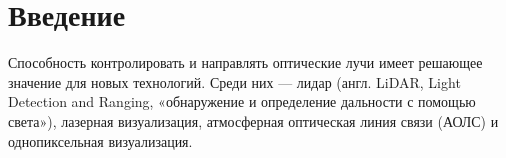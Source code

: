 \chapter*{Введение}

Способность контролировать и направлять оптические лучи имеет решающее значение для новых технологий. Среди них — лидар (англ. LiDAR, Light Detection and Ranging, «обнаружение и определение дальности с помощью света»)\cite{jaboyedoff2012use}, лазерная визуализация\cite{holmstrom2014mems}, атмосферная оптическая линия связи (АОЛС)\cite{khalighi2014survey} и однопиксельная визуализация\cite{edgar2019principles}.